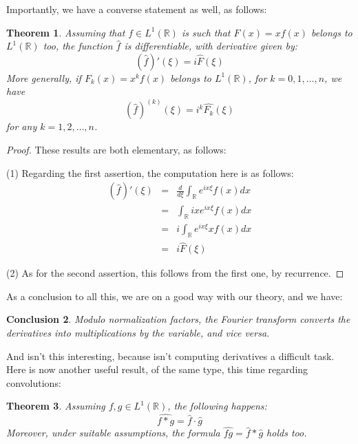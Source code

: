 \documentclass[12pt]{amsbook}
\newtheorem{theorem}{Theorem}[chapter]
\newtheorem{conclusion}[theorem]{Conclusion}
\begin{document}
Importantly, we have a converse statement as well, as follows:

\begin{theorem}
Assuming that $f\in L^1(\mathbb R)$ is such that $F(x)=xf(x)$ belongs to $L^1(\mathbb R)$ too, the function $\widehat{f}$ is differentiable, with derivative given by:
$$(\widehat{f})'(\xi)=i\widehat{F}(\xi)$$
More generally, if $F_k(x)=x^kf(x)$ belongs to $L^1(\mathbb R)$, for $k=0,1,\ldots,n$, we have
$$(\widehat{f})^{(k)}(\xi)=i^k\widehat{F_k}(\xi)$$
for any $k=1,2,\ldots,n$.
\end{theorem}

\begin{proof}
These results are both elementary, as follows:

\medskip

(1) Regarding the first assertion, the computation here is as follows:
\begin{eqnarray*}
(\widehat{f})'(\xi)
&=&\frac{d}{d\xi}\int_\mathbb R e^{ix\xi}f(x)dx\\
&=&\int_\mathbb R ixe^{ix\xi}f(x)dx\\
&=&i\int_\mathbb R e^{ix\xi}xf(x)dx\\
&=&i\widehat{F}(\xi)
\end{eqnarray*}

(2) As for the second assertion, this follows from the first one, by recurrence.
\end{proof}

As a conclusion to all this, we are on a good way with our theory, and we have:

\begin{conclusion}
Modulo normalization factors, the Fourier transform converts the derivatives into multiplications by the variable, and vice versa.
\end{conclusion}

And isn't this interesting, because isn't computing derivatives a difficult task. Here is now another useful result, of the same type, this time regarding convolutions:

\begin{theorem}
Assuming $f,g\in L^1(\mathbb R)$, the following happens:
$$\widehat{f*g}=\widehat{f}\cdot\widehat{g}$$
Moreover, under suitable assumptions, the formula $\widehat{fg}=\widehat{f}*\widehat{g}$ holds too.
\end{theorem}
\end{document}
